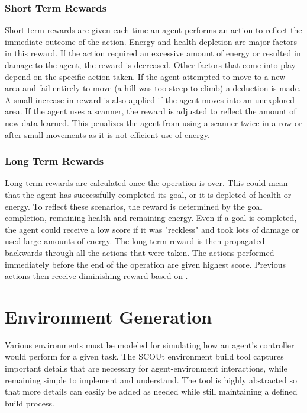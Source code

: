 \subsubsection{Short Term Rewards}
Short term rewards are given each time an agent performs an action to reflect the immediate outcome of the action.
Energy and health depletion are major factors in this reward.
If the action required an excessive amount of energy or resulted in damage to the agent, the reward is decreased.
Other factors that come into play depend on the specific action taken.
If the agent attempted to move to a new area and fail entirely to move (a hill was too steep to climb) a deduction is made.
A small increase in reward is also applied if the agent moves into an unexplored area.
If the agent uses a scanner, the reward is adjusted to reflect the amount of new data learned.
This penalizes the agent from using a scanner twice in a row or after small movements as it is not efficient use of energy.

\subsubsection{Long Term Rewards}
Long term rewards are calculated once the operation is over.
This could mean that the agent has successfully completed its goal, or it is depleted of health or energy.
To reflect these scenarios, the reward is determined by the goal completion, remaining health and remaining energy. 
Even if a goal is completed, the agent could receive a low score if it was "reckless" and took lots of damage or used large amounts of energy.
The long term reward is then propagated backwards through all the actions that were taken.
The actions performed immediately before the end of the operation are given highest score.
Previous actions then receive diminishing reward based on .



\section{Environment Generation}
Various environments must be modeled for simulating how an agent's controller would perform for a given task.
The SCOUt environment build tool captures important details that are necessary for agent-environment interactions, while remaining simple to implement and understand.
The tool is highly abstracted so that more details can easily be added as needed while still maintaining a defined build process.

